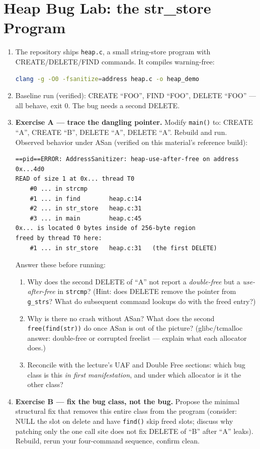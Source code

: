 \documentclass[12pt]{Training}
\begin{document}
\section*{Heap Bug Lab: the str\_store Program}
\begin{enumerate}
    \item The repository ships \lstinline{heap.c}, a small string-store program with CREATE/DELETE/FIND commands. It compiles warning-free:
        \begin{lstlisting}[language=bash]
clang -g -O0 -fsanitize=address heap.c -o heap_demo
        \end{lstlisting}
    \item Baseline run (verified): CREATE ``FOO'', FIND ``FOO'', DELETE ``FOO'' --- all behave, exit 0. The bug needs a second DELETE.
    \item \textbf{Exercise A --- trace the dangling pointer.} Modify \lstinline{main()} to: CREATE ``A'', CREATE ``B'', DELETE ``A'', DELETE ``A''. Rebuild and run. Observed behavior under ASan (verified on this material's reference build):
        \begin{lstlisting}
==pid==ERROR: AddressSanitizer: heap-use-after-free on address 0x...4d0
READ of size 1 at 0x... thread T0
    #0 ... in strcmp
    #1 ... in find        heap.c:14
    #2 ... in str_store   heap.c:31
    #3 ... in main        heap.c:45
0x... is located 0 bytes inside of 256-byte region
freed by thread T0 here:
    #1 ... in str_store   heap.c:31   (the first DELETE)
        \end{lstlisting}
        Answer these before running:
        \begin{enumerate}
            \item Why does the second DELETE of ``A'' not report a \emph{double-free} but a \emph{use-after-free} in \lstinline{strcmp}? (Hint: does DELETE remove the pointer from \lstinline{g_strs}? What do subsequent command lookups do with the freed entry?)
            \item Why is there no crash without ASan? What does the second \lstinline{free(find(str))} do once ASan is out of the picture? (glibc/tcmalloc answer: double-free or corrupted freelist --- explain what each allocator does.)
            \item Reconcile with the lecture's UAF and Double Free sections: which bug class is this \emph{in first manifestation}, and under which allocator is it the other class?
        \end{enumerate}
    \item \textbf{Exercise B --- fix the bug class, not the bug.} Propose the minimal structural fix that removes this entire class from the program (consider: NULL the slot on delete and have \lstinline{find()} skip freed slots; discuss why patching only the one call site does not fix DELETE of ``B'' after ``A'' leaks). Rebuild, rerun your four-command sequence, confirm clean.

\end{enumerate}
\end{document}
